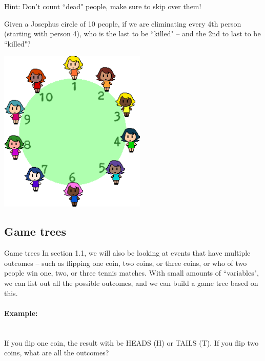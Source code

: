 {\begin{questionNOGRADE}{\thequestion}
        \begin{hint}{Hint:}
            Don't count ``dead" people, make sure to skip over them!
        \end{hint}
        
    \end{questionNOGRADE}

    \begin{questionNOGRADE}{\thequestion}
        Given a Josephus circle of 10 people,
        if we are eliminating every 4th person (starting with person 4),
        who is the last to be ``killed" – and the 2nd to last to be ``killed"?

        \begin{center}
            \includegraphics[width=7cm]{images/josephus-10.png}
        \end{center}
    \end{questionNOGRADE}
    
    \subsection{Game trees}

    \begin{intro}{Game trees}
        In section 1.1, we will also be looking at events that have multiple outcomes –
        such as flipping one coin, two coins, or three coins, or who of two people win
        one, two, or three tennis matches. With small amounts of ``variables", we can
        list out all the possible outcomes, and we can build a game tree based on this.
        
        \paragraph{Example:} ~\\
        If you flip one coin, the result with be HEADS (H) or TAILS (T).
        If you flip two coins, what are all the outcomes?


\end{intro}}
